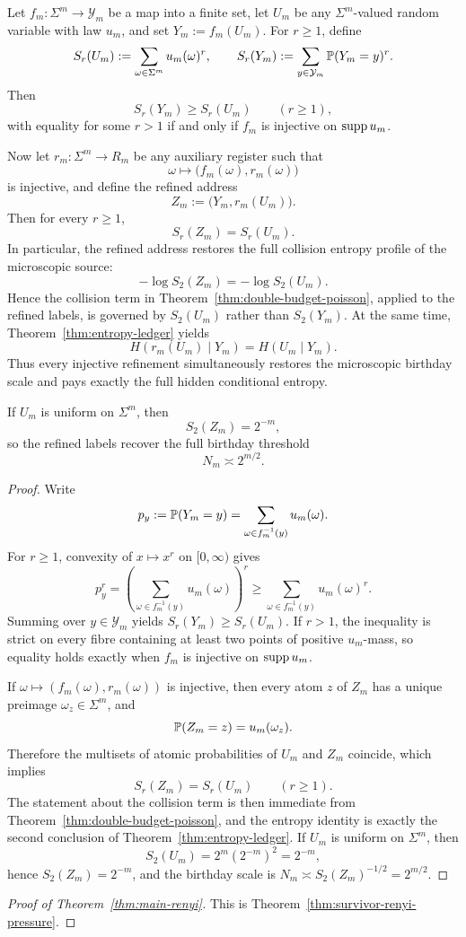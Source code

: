 \begin{theorem}
\label{thm:collision-profile-restoration}
Let \(f_m:\Sigma^m\to \mathcal{Y}_m\) be a map into a finite set, let
\(U_m\) be any \(\Sigma^m\)-valued random variable with law \(u_m\), and
set \(Y_m:=f_m(U_m)\).  For \(r\geq 1\), define
\[
  S_r(U_m):=\sum_{\omega\in\Sigma^m}u_m(\omega)^r,
  \qquad
  S_r(Y_m):=\sum_{y\in\mathcal{Y}_m}\mathbb{P}(Y_m=y)^r.
\]
Then
\[
  S_r(Y_m)\geq S_r(U_m)
  \qquad (r\geq 1),
\]
with equality for some \(r>1\) if and only if \(f_m\) is injective on
\(\operatorname{supp} u_m\).

Now let \(r_m:\Sigma^m\to R_m\) be any auxiliary register such that
\[
  \omega\longmapsto \bigl(f_m(\omega),r_m(\omega)\bigr)
\]
is injective, and define the refined address
\[
  Z_m:=\bigl(Y_m,r_m(U_m)\bigr).
\]
Then for every \(r\geq 1\),
\[
  S_r(Z_m)=S_r(U_m).
\]
In particular, the refined address restores the full collision entropy
profile of the microscopic source:
\[
  -\log S_2(Z_m)=-\log S_2(U_m).
\]
Hence the collision term in
Theorem~\ref{thm:double-budget-poisson}, applied to the refined labels,
is governed by \(S_2(U_m)\) rather than \(S_2(Y_m)\).  At the same
time, Theorem~\ref{thm:entropy-ledger} yields
\[
  H(r_m(U_m)\mid Y_m)=H(U_m\mid Y_m).
\]
Thus every injective refinement simultaneously restores the microscopic
birthday scale and pays exactly the full hidden conditional entropy.

If \(U_m\) is uniform on \(\Sigma^m\), then
\[
  S_2(Z_m)=2^{-m},
\]
so the refined labels recover the full birthday threshold
\[
  N_m\asymp 2^{m/2}.
\]
\end{theorem}

\begin{proof}
Write
\[
  p_y:=\mathbb{P}(Y_m=y)=\sum_{\omega\in f_m^{-1}(y)}u_m(\omega).
\]
For \(r\geq 1\), convexity of \(x\mapsto x^r\) on \([0,\infty)\) gives
\[
  p_y^r
  = \left(\sum_{\omega\in f_m^{-1}(y)}u_m(\omega)\right)^r
  \geq \sum_{\omega\in f_m^{-1}(y)}u_m(\omega)^r.
\]
Summing over \(y\in\mathcal Y_m\) yields \(S_r(Y_m)\geq S_r(U_m)\).  If
\(r>1\), the inequality is strict on every fibre containing at least two
points of positive \(u_m\)-mass, so equality holds exactly when \(f_m\)
is injective on \(\operatorname{supp} u_m\).

If \(\omega\mapsto(f_m(\omega),r_m(\omega))\) is injective, then every
atom \(z\) of \(Z_m\) has a unique preimage \(\omega_z\in\Sigma^m\), and
\[
  \mathbb{P}(Z_m=z)=u_m(\omega_z).
\]
Therefore the multisets of atomic probabilities of \(U_m\) and \(Z_m\)
coincide, which implies
\[
  S_r(Z_m)=S_r(U_m)
  \qquad (r\geq 1).
\]
The statement about the collision term is then immediate from
Theorem~\ref{thm:double-budget-poisson}, and the entropy identity is
exactly the second conclusion of Theorem~\ref{thm:entropy-ledger}.  If
\(U_m\) is uniform on \(\Sigma^m\), then
\[
  S_2(U_m)=2^m(2^{-m})^2=2^{-m},
\]
hence \(S_2(Z_m)=2^{-m}\), and the birthday scale is
\(N_m\asymp S_2(Z_m)^{-1/2}=2^{m/2}\).
\end{proof}

\begin{proof}[Proof of Theorem~\ref{thm:main-renyi}]
This is Theorem~\ref{thm:survivor-renyi-pressure}.
\end{proof}
